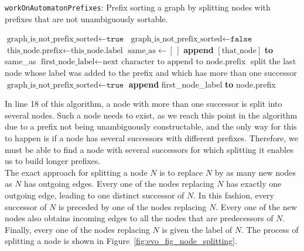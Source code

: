 \documentclass[a4paper,12pt,twoside,BCOR=10mm]{scrbook}
\begin{document}
\begin{algorithm}
\caption[\texttt{workOnAutomatonPrefixes}: Prefix sort a graph]{\texttt{workOnAutomatonPrefixes}: Prefix sorting a graph by splitting nodes with prefixes that are not unambiguously sortable.}
\label{alg:workOnAutomatonPrefixes}
\begin{algorithmic}[1]
\State $ \textrm{graph\_is\_not\_prefix\_sorted} \gets \texttt{true} $
	\State $ \textrm{graph\_is\_not\_prefix\_sorted} \gets \texttt{false} $
		\State $ \textrm{this\_node.prefix} \gets \textrm{this\_node.label} $
	\EndFor
		\State $ \textrm{same\_as} \gets [ \, ] $
				\State \textbf{append} $ [\textrm{that\_node}] $ \textbf{to} same\_as
			\EndIf
		\EndFor
				\State $ \textrm{first\_node\_label} \gets \textrm{next character to append to node.prefix} $
					\State split the last node whose label was added to the prefix and which
						\State \phantom{first} has more than one successor
					\State $ \textrm{graph\_is\_not\_prefix\_sorted} \gets \texttt{true} $
				\Else
					\State \textbf{append} first\_node\_label \textbf{to} node.prefix
				\EndIf
			\EndFor
		\EndIf
	\EndFor
\EndWhile
\end{algorithmic}
\end{algorithm}
In line 18 of this algorithm, a node with more than one successor is split into several nodes.
Such a node needs to exist, as we reach this point in the algorithm due to a prefix
not being unambiguously constructable, and the only way for this to happen is if a node has
several successors with different prefixes. Therefore, we must be able to find a node with
several successors for which splitting it enables us to build longer prefixes. \\
The exact approach for splitting a node $ N $ is to replace $ N $ by as many new nodes as $ N $ has
outgoing edges.
Every one of the nodes replacing $ N $ has exactly one outgoing edge, leading to
one distinct successor of $ N $.
In this fashion, every successor of $ N $ is preceded by one of the nodes replacing $ N $.
Every one of the new nodes also obtains incoming edges to all the nodes that are predecessors of $ N $.
Finally, every one of the nodes replacing $ N $ is given the label of $ N $.
The process of splitting a node is shown in Figure~\ref{fig:evo_fig_node_splitting}.
\end{document}
